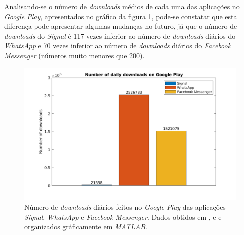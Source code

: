 Analisando-se o número de \textit{downloads} médios de cada uma das aplicações no \textit{Google Play}, apresentados no gráfico da figura \ref{graph:downloads_daily}, pode-se constatar que esta diferença pode apresentar algumas mudanças no futuro, já que o número de \textit{downloads} do \textit{Signal} é 117 vezes inferior ao número de \textit{downloads} diários do \textit{WhatsApp} e 70 vezes inferior ao número de \textit{downloads} diários do \textit{Facebook Messenger} (números muito menores que 200).

\begin{figure}[H]
   \begin{center}
       \includegraphics[width=15cm]{img/daily_downloads.png}
       \caption{Número de \textit{downloads} diários feitos no \textit{Google Play} das aplicações \textit{Signal}, \textit{WhatsApp} e \textit{Facebook Messenger}. Dados obtidos em \cite{signal_android}, \cite{whatsapp_downloads_android} e \cite{messenger_downloads_android} e organizados gráficamente em \textit{MATLAB}.}
       \label{graph:downloads_daily}
   \end{center}
\end{figure}

